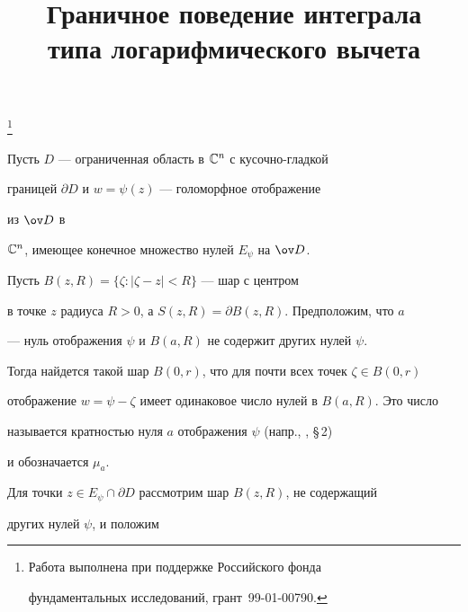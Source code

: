 

\title{Граничное поведение интеграла\\ типа логарифмического вычета}


\thanks{Работа выполнена при поддержке Российского фонда 


фундаментальных исследований, грант \No\,99-01-00790.}





\date{}




\pagestyle{plain} %







\maketitle


\label{begin}





Пусть $D$ --- ограниченная область в $\Bbb C^n$ с кусочно-гладкой


границей $\partial D$ и $w=\psi(z)$ --- голоморфное отображение


из $\ov D$ в


$\Bbb C^n$, имеющее конечное множество нулей $E_\psi$ на $\ov D$.


Пусть $B(z,R)=\{\zeta: |\zeta-z|<R\}$ --- шар с центром


в точке $z$ радиуса $R>0$, а $S(z,R)=\partial B(z,R)$. Предположим, что $a$


--- нуль отображения $\psi$ и $B(a,R)$ не содержит других нулей $\psi$.


Тогда найдется такой шар $B(0,r)$, что для почти всех точек $\zeta\in B(0,r)$


отображение $w=\psi-\zeta$ имеет одинаковое число нулей в $B(a,R)$. Это число


называется кратностью нуля $a$ отображения $\psi$ (напр., \cite{AY}, \S\,2)


и обозначается $\mu_a$.





Для точки $z\in E_\psi\cap\partial D$ рассмотрим шар $B(z,R)$, не содержащий


других нулей $\psi$, и положим


